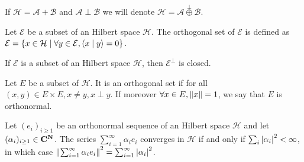 \begin{note}
	If $\mathcal{H} = \mathcal{A} + \mathcal{B}$ and $\mathcal{A} \perp \mathcal{B}$ we will denote $\mathcal{H} = \mathcal{A} \overset{\perp}{\oplus} \mathcal{B}$.
\end{note}

\begin{defn}
	Let $\mathcal{E}$ be a subset of an Hilbert space $\mathcal{H}$.
	The orthogonal set of $\mathcal{E}$ is defined as $\mathcal{E} = \{ x \in \mathcal{H} \mid \forall y \in \mathcal{E}, \left\langle x \mid y \right\rangle = 0 \}$.
\end{defn}

\begin{thm}
	If $\mathcal{E}$ is a subset of an Hilbert space $\mathcal{H}$, then $\mathcal{E}^{\perp}$ is closed.
\end{thm}

\begin{defn}
	Let $E$ be a subset of $\mathcal{H}$.
	It is an orthogonal set if for all $(x,y) \in E \times E, x \neq y, x \perp y$.
	If moreover $\forall x \in E, \left\lVert x\right\rVert = 1$, we say that $E$ is orthonormal.
\end{defn}

\begin{thm}
	Let $(e_{i})_{i \geq 1}$ be an orthonormal sequence of an Hilbert space $\mathcal{H}$ and let $(\alpha_{i})_{i \geq 1} \in \mathbf{C}^{\mathbf{N}}$.
	The series $\sum_{i = 1}^\infty \alpha_i e_i$ converges in $\mathcal{H}$ if and only if $\sum_i \left\lvert\alpha_i\right\rvert^2 < \infty$, in which case $\left\lVert\sum_{i = 1}^\infty \alpha_i e_i\right\rVert^2 = \sum_{i = 1}^\infty \left\lvert\alpha_i\right\rvert^2$.
\end{thm}

